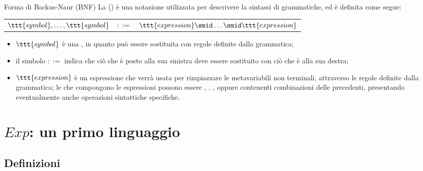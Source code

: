 \documentclass[a4paper, 12pt]{report}
\begin{document}
    \begin{frameddefn}{Forma di Backus-Naur (BNF)}
        La  () è una notazione utilizzata per descrivere la sintassi di grammatiche, ed è definita come segue: 

        \begin{center}
            \begin{tabular}{rcl}
                $\ttt{symbol}, \ldots, \ttt{symbol}$ & $::=$ & $\ttt{expression} \smid \ldots \smid \ttt{expression}$ \\
            \end{tabular}
        \end{center}

        \begin{itemize}
            \item $\ttt{symbol}$ è una , in quanto può essere sostituita con regole definite dalla grammatica;
            \item il simbolo $::=$ indica che ciò che è posto alla sua sinistra deve essere sostituito con ciò che è alla sua destra;
            \item $\ttt{expression}$ è un espressione che verrà usata per rimpiazzare le metavariabili non terminali, attraverso le regole definite dalla grammatica; le  che compongono le espressioni possono essere , , , oppure  contenenti combinazioni delle precedenti, presentando eventualmente anche operazioni sintattiche specifiche.
        \end{itemize}
    \end{frameddefn}

    \section{$Exp$: un primo linguaggio}

    \subsection{Definizioni}
\end{document}
